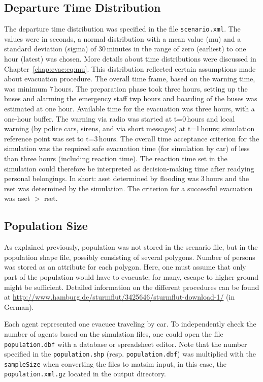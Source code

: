 \subsection{Departure Time Distribution}
The departure time distribution was specified in the file \lstinline|scenario.xml|. The values were in seconds, \ie a normal distribution with a mean value (mu) and a standard deviation (sigma) of 30\,minutes in the range of zero (earliest) to one hour (latest) was chosen. 
More details about time distributions were discussed in Chapter~\ref{chap:evac:eq:mu}. This distribution reflected certain assumptions made about evacuation procedure. The overall time frame, based on the warning time, was minimum 7\,hours. The preparation phase took three hours, setting up the buses and alarming the emergency staff twp hours and boarding of the buses was estimated at one hour. Available time for the evacuation was three hours, with a one-hour buffer. 
The warning via radio was started at t=0\,hours and local warning (\eg by police cars, sirens, and via short messages) at t=1\,hours; simulation reference point was set to t=3\,hours. The overall time acceptance criterion for the simulation was the required safe evacuation time (for simulation by car) of less than three hours (including reaction time). The reaction time set in the simulation could therefore be interpreted as decision-making time after readying personal belongings. In short: \gls{aset} determined by flooding was 3\,hours and the \gls{rset} was determined by the simulation. The criterion for a successful evacuation was \gls{aset} $>$ \gls{rset}.

\subsection{Population Size}
As explained previously, population was not stored in the scenario file, but in the population shape file, possibly consisting of several polygons. Number of persons was stored as an attribute for each polygon. Here, one must assume that only part of the population would have to evacuate; for many, escape to higher ground might be sufficient. Detailed information on the different procedures can be found at \url{http://www.hamburg.de/sturmflut/3425646/sturmflut-download-1/} (in German).

Each agent represented one evacuee traveling by car. To independently check the number of agents based on the simulation files, one could open the file \lstinline|population.dbf| with a database or spreadsheet editor. Note that the number specified in the \lstinline|population.shp| (resp. \lstinline|population.dbf|) was multiplied with the \lstinline|sampleSize| when converting the files to \gls{matsim} input, \ie in this case, the \lstinline|population.xml.gz| located in the output directory.

